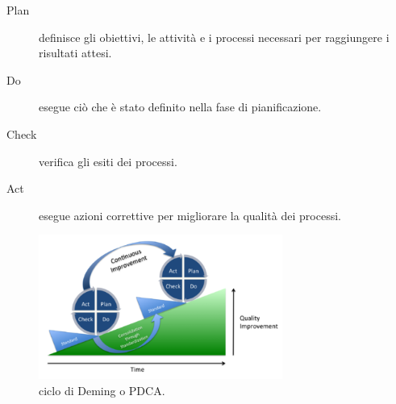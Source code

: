 \documentclass[../../norme-di-progetto.tex]{subfiles}
\begin{document}
\begin{description}
  \item [Plan] definisce gli obiettivi, le attività e i processi necessari per raggiungere i risultati attesi.
  \item [Do] esegue ciò che è stato definito nella fase di pianificazione.
  \item [Check] verifica gli esiti dei processi.
  \item [Act] esegue azioni correttive per migliorare la qualità dei processi.
\end{description}
\begin{figure}[H]
  \includegraphics[width=8cm]{PDCA-process.png}
  \centering
  \caption{ciclo di Deming o PDCA.}
\end{figure}



\end{document}
